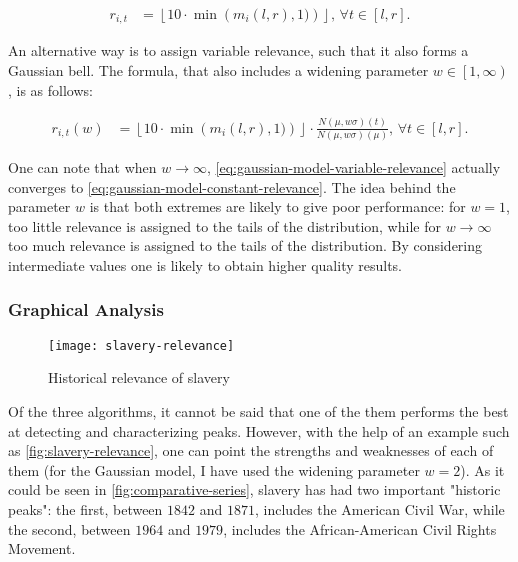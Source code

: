 \begin{align}
\label{eq:gaussian-model-constant-relevance}
r_{i, t} &= \left\lfloor 10 \cdot \min \left( m_i \left( l, r \right), 1) \right) \right\rfloor, \, \forall t \in \left[ l, r \right].
\end{align}

An alternative way is to assign variable relevance, such that it also forms a Gaussian bell. The formula, that also includes a widening parameter $w \in \left[ 1, \infty \right)$, is as follows:

\begin{align}
\label{eq:gaussian-model-variable-relevance}
r_{i, t} \left( w \right) &= \left\lfloor 10 \cdot \min \left( m_i \left( l, r \right), 1) \right) \right\rfloor \cdot \frac{N \left( \mu, w \sigma \right) \left( t \right)}{N \left( \mu, w \sigma \right) \left( \mu \right)}, \, \forall t \in \left[ l, r \right].
\end{align}

One can note that when $w \to \infty$, \autoref{eq:gaussian-model-variable-relevance} actually converges to \autoref{eq:gaussian-model-constant-relevance}. The idea behind the parameter $w$ is that both extremes are likely to give poor performance: for $w = 1$, too little relevance is assigned to the tails of the distribution, while for $w \to \infty$ too much relevance is assigned to the tails of the distribution. By considering intermediate values one is likely to obtain higher quality results.

\subsubsection{Graphical Analysis}

\begin{figure}
\centering
\texttt{[image: slavery-relevance]}
\caption{Historical relevance of slavery}
\label{fig:slavery-relevance}
\end{figure}

Of the three algorithms, it cannot be said that one of the them performs the best at detecting and characterizing peaks. However, with the help of an example such as \autoref{fig:slavery-relevance}, one can point the strengths and weaknesses of each of them (for the Gaussian model, I have used the widening parameter $w = 2$). As it could be seen in \autoref{fig:comparative-series}, slavery has had two important "historic peaks": the first, between $1842$ and $1871$, includes the American Civil War, while the second, between $1964$ and $1979$, includes the African-American Civil Rights Movement.

